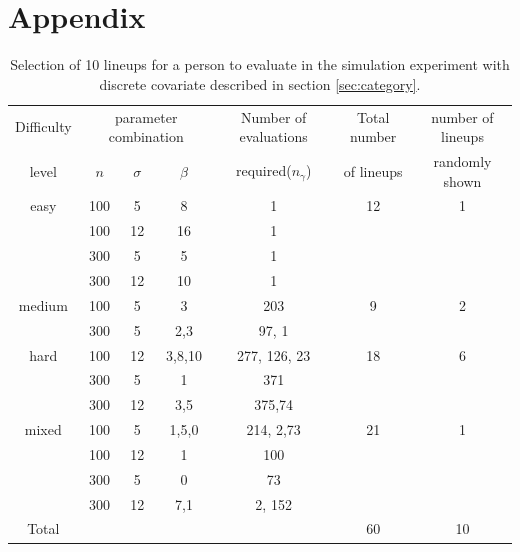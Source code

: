 \documentclass{article}
\begin{document}
%
%

%


\section*{Appendix}

\begin{table}[hbtp]
\caption{Selection of 10 lineups for a person to evaluate in the simulation experiment with discrete covariate described in section \ref{sec:category}.} 
\centering
\begin{tabular}{c c c c  c c c}
\hline\hline
Difficulty& \multicolumn{3}{c}{parameter combination}& Number of evaluations &Total number  & number of lineups\\
level & $n$ & $\sigma$ & $\beta$ &required($n_{\gamma}$) & of lineups & randomly shown \\
\hline
easy&100& 5&8 & 1& 12 & 1\\
&100&12&16 &1&&\\
&300& 5&5 &1&&\\
&300&12&10 &1 &&\\
\hline
medium&100& 5&3 &203 & 9 &2\\
&300& 5&2,3 & 97, 1&&\\
\hline
hard&100&12&3,8,10 & 277, 126, 23& 18 &6\\
&300& 5&1 & 371 &&\\
&300&12&3,5& 375,74 &&\\
\hline
mixed&100& 5&1,5,0& 214, 2,73 & 21 &1\\
&100&12&1& 100& &\\
&300& 5&0 & 73&&\\
&300&12&7,1& 2, 152&&\\
\hline
Total &&&&&60&10\\
\hline
\end{tabular}
\label{tbl:dist_lineup1}
\end{table} 
\end{document}
